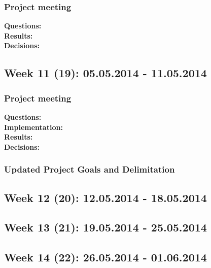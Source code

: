 \subsubsection*{Project meeting}
\textbf{Questions:}\\


\textbf{Results:}\\

\textbf{Decisions:}\\




\subsection*{Week 11 (19): 05.05.2014 - 11.05.2014}
\subsubsection*{Project meeting}
\textbf{Questions:}\\

\textbf{Implementation:}\\

\textbf{Results:}\\

\textbf{Decisions:}\\

\subsubsection*{Updated Project Goals and Delimitation}



\subsection*{Week 12 (20): 12.05.2014 - 18.05.2014}
\subsection*{Week 13 (21): 19.05.2014 - 25.05.2014}
\subsection*{Week 14 (22): 26.05.2014 - 01.06.2014}



